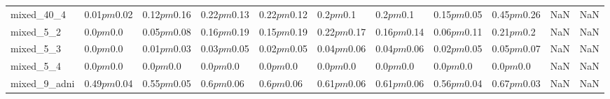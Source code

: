 \begin{tabular}{lllllllllll}
mixed_40_4 & 0.01$pm$0.02 & 0.12$pm$0.16 & 0.22$pm$0.13 & 0.22$pm$0.12 & 0.2$pm$0.1 & 0.2$pm$0.1 & 0.15$pm$0.05 & 0.45$pm$0.26 & NaN & NaN \\
mixed_5_2 & 0.0$pm$0.0 & 0.05$pm$0.08 & 0.16$pm$0.19 & 0.15$pm$0.19 & 0.22$pm$0.17 & 0.16$pm$0.14 & 0.06$pm$0.11 & 0.21$pm$0.2 & NaN & NaN \\
mixed_5_3 & 0.0$pm$0.0 & 0.01$pm$0.03 & 0.03$pm$0.05 & 0.02$pm$0.05 & 0.04$pm$0.06 & 0.04$pm$0.06 & 0.02$pm$0.05 & 0.05$pm$0.07 & NaN & NaN \\
mixed_5_4 & 0.0$pm$0.0 & 0.0$pm$0.0 & 0.0$pm$0.0 & 0.0$pm$0.0 & 0.0$pm$0.0 & 0.0$pm$0.0 & 0.0$pm$0.0 & 0.0$pm$0.0 & NaN & NaN \\
mixed_9_adni & 0.49$pm$0.04 & 0.55$pm$0.05 & 0.6$pm$0.06 & 0.6$pm$0.06 & 0.61$pm$0.06 & 0.61$pm$0.06 & 0.56$pm$0.04 & 0.67$pm$0.03 & NaN & NaN \\
\bottomrule
\end{tabular}
